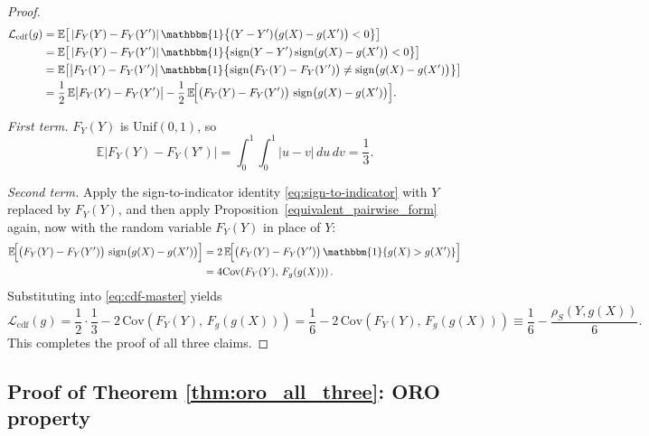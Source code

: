 \documentclass[11pt]{article}
\theoremstyle{plain}
\theoremstyle{plain}
\theoremstyle{plain}
\theoremstyle{plain}
\theoremstyle{plain}
\theoremstyle{plain}
\theoremstyle{plain}
\begin{document}
\begin{proof}
\begin{align}
\mathcal{L}_{\mathrm{cdf}}(g)
&= \mathbb{E}\!\left[\,|F_Y(Y)-F_Y(Y')|\,\mathbbm{1}\!\left\{(Y-Y')\big(g(X)-g(X')\big)<0\right\}\right] \nonumber \\
&= \mathbb{E}\!\left[\,|F_Y(Y)-F_Y(Y')|\,\mathbbm{1}\!\left\{\operatorname{sign}(Y-Y')\operatorname{sign}(g(X)-g(X')\big)<0\right\}\right] \nonumber \\
&=\mathbb{E}\!\left[\big|F_Y(Y)-F_Y(Y')\big|\,
\mathbbm{1}\!\left\{\operatorname{sign}\!\big(F_Y(Y)-F_Y(Y')\big)\neq \operatorname{sign}\!\big(g(X)-g(X')\big)\right\}\right] \nonumber \\
&=
\frac12\,\mathbb{E}\big|F_Y(Y)-F_Y(Y')\big|
-\frac12\,\mathbb{E}\!\Big[\big(F_Y(Y)-F_Y(Y')\big)\,\operatorname{sign}\!\big(g(X)-g(X')\big)\Big].
\label{eq:cdf-master}
\end{align}
\smallskip

\emph{First term.} $F_Y(Y)$ is $\mathrm{Unif}(0,1)$, so
\[
\mathbb{E}\big|F_Y(Y)-F_Y(Y')\big|
=
\int_0^1\!\!\int_0^1 |u-v|\,du\,dv
=
\frac13.
\]

\smallskip
\emph{Second term.} Apply the sign-to-indicator identity \eqref{eq:sign-to-indicator}
with $Y$ replaced by $F_Y(Y)$, and then apply Proposition~\ref{equivalent_pairwise_form} again, now with the random variable $F_Y(Y)$
in place of $Y$:
\begin{align}
    \mathbb{E}\!\Big[\big(F_Y(Y)-F_Y(Y')\big)\,\operatorname{sign}\!\big(g(X)-g(X')\big)\Big] &= 2\,\mathbb{E}\!\Big[\big(F_Y(Y)-F_Y(Y')\big)\,\mathbbm{1}\{g(X)>g(X')\}\Big] \nonumber \\
    &= 4\mathrm{Cov}\!\left(F_Y(Y),\,F_g(g(X))\right) . \nonumber
\end{align}
Substituting into \eqref{eq:cdf-master} yields
\[
\mathcal{L}_{\mathrm{cdf}}(g)
=
\frac12\cdot\frac13
-2\,\mathrm{Cov}\!\left(F_Y(Y),\,F_g(g(X))\right)
=
\frac16
-2\,\mathrm{Cov}\!\left(F_Y(Y),\,F_g(g(X))\right)
\equiv \frac16-\frac{\rho_S(Y,g(X))}{6} .
\]
\medskip
This completes the proof of all three claims.
\end{proof}



\subsection{Proof of Theorem \ref{thm:oro_all_three}: ORO property}
\label{proof_of_oro}
\end{document}
